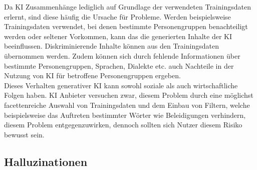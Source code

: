 \documentclass[../main.tex]{subfiles}
\begin{document}
Da KI Zusammenhänge lediglich auf Grundlage der verwendeten Trainingsdaten erlernt, sind diese häufig die Ursache für Probleme. Werden beispielsweise Trainingsdaten verwendet, 
bei denen bestimmte Personengruppen benachteiligt werden oder seltener Vorkommen, kann das die generierten Inhalte der KI beeinflussen. Diskriminierende Inhalte können aus den Trainingsdaten 
übernommen werden. Zudem können sich durch fehlende Informationen über bestimmte Personengruppen, Sprachen, Dialekte etc. auch Nachteile in der Nutzung von KI für betroffene 
Personengruppen ergeben.\\ Dieses Verhalten generativer KI kann sowohl soziale als auch wirtschaftliche Folgen haben. KI Anbieter versuchen zwar, diesem Problem durch eine möglichst 
facettenreiche Auswahl von Trainingsdaten und dem Einbau von Filtern, welche beispielsweise das Auftreten bestimmter Wörter wie Beleidigungen verhindern, diesem Problem entgegenzuwirken, 
dennoch sollten sich Nutzer diesem Risiko bewusst sein.\\

\subsection{Halluzinationen}
\end{document}
